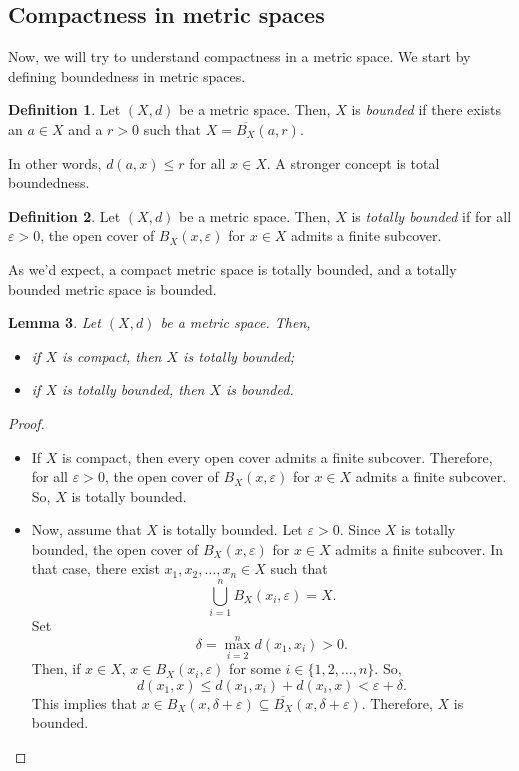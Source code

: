 \documentclass[a4paper, openany]{memoir}
\theoremstyle{definition}
\newtheorem{definition}{Definition}[section]
\theoremstyle{plain}
\newtheorem{lemma}[definition]{Lemma}
\begin{document}
\subsection{Compactness in metric spaces}
Now, we will try to understand compactness in a metric space. We start by defining boundedness in metric spaces.
\begin{definition}
Let $(X, d)$ be a metric space. Then, $X$ is \emph{bounded} if there exists an $a \in X$ and a $r > 0$ such that $X = \overline{B_X}(a, r)$.
\end{definition}
\noindent In other words, $d(a, x) \leqslant r$ for all $x \in X$. A stronger concept is total boundedness.
\begin{definition}
Let $(X, d)$ be a metric space. Then, $X$ is \emph{totally bounded} if for all $\varepsilon > 0$, the open cover of $B_X(x, \varepsilon)$ for $x \in X$ admits a finite subcover.
\end{definition}
\noindent As we'd expect, a compact metric space is totally bounded, and a totally bounded metric space is bounded.
\begin{lemma}
Let $(X, d)$ be a metric space. Then,
\begin{itemize}
    \item if $X$ is compact, then $X$ is totally bounded;
    \item if $X$ is totally bounded, then $X$ is bounded.
\end{itemize}
\end{lemma}
\begin{proof}
\hspace*{0pt}
\begin{itemize}
    \item If $X$ is compact, then every open cover admits a finite subcover. Therefore, for all $\varepsilon > 0$, the open cover of $B_X(x, \varepsilon)$ for $x \in X$ admits a finite subcover. So, $X$ is totally bounded.
    
    \item Now, assume that $X$ is totally bounded. Let $\varepsilon > 0$. Since $X$ is totally bounded, the open cover of $B_X(x, \varepsilon)$ for $x \in X$ admits a finite subcover. In that case, there exist $x_1, x_2, \dots, x_n \in X$ such that
    \[\bigcup_{i=1}^n B_X(x_i, \varepsilon) = X.\]
    Set 
    \[\delta = \max_{i=2}^n d(x_1, x_i) > 0.\]
    Then, if $x \in X$, $x \in B_X(x_i, \varepsilon)$ for some $i \in \{1, 2, \dots, n\}$. So,
    \[d(x_1, x) \leqslant d(x_1, x_i) + d(x_i, x) < \varepsilon + \delta.\]
    This implies that $x \in B_X(x, \delta + \varepsilon) \subseteq \overline{B_X}(x, \delta + \varepsilon)$. Therefore, $X$ is bounded.
\end{itemize}
\end{proof}
\end{document}
